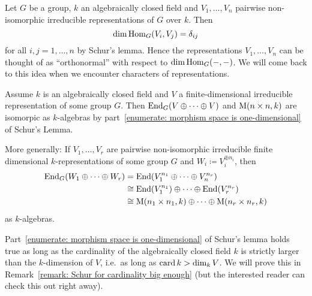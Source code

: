 \begin{remark}
  Let $G$ be a group, $k$ an algebraically closed field and $V_1, \dotsc, V_n$ pairwise non-isomorphic irreducible representations of $G$ over $k$.
  Then
  \[
      \dim \operatorname{Hom}_G(V_i, V_j)
    = \delta_{ij}
  \]
  for all $i,j = 1, \dotsc, n$ by Schur’s lemma.
  Hence the representations $V_1, \dotsc, V_n$ can be thought of as “orthonormal” with respect to $\dim \operatorname{Hom}_G(-,-)$.
  We will come back to this idea when we encounter characters of representations.
\end{remark}


\begin{remark}
  Assume $k$ is an algebraically closed field and $V$ a finite-dimensional irreducible representation of some group $G$.
  Then $\operatorname{End}_G(V \oplus \dotsb \oplus V)$ and $\operatorname{M}(n \times n, k)$ are isomorpic as $k$-algebras by part~\ref{enumerate: morphism space is one-dimensional} of Schur’s Lemma.
  
  More generally:
  If $V_1, \dotsc, V_r$ are pairwise non-isomorphic irreducible finite dimensional $k$-representations of some group $G$ and $W_i \coloneqq V_i^{\oplus n_i}$, then
  \begin{align*}
            \operatorname{End}_G(W_1 \oplus \dotsb \oplus W_r)
    &=      \operatorname{End}(V_1^{n_1} \oplus \dotsb \oplus V_n^{n_r})
    \\
    &\cong  \operatorname{End}(V_1^{n_1}) \oplus \dotsb \oplus \operatorname{End}(V_r^{n_r})
    \\
    &\cong  \operatorname{M}(n_1 \times n_1, k) \oplus \dotsb \oplus \operatorname{M}(n_r \times n_r, k)
  \end{align*}
  as $k$-algebras.
\end{remark}


\begin{remark}
  Part~\ref{enumerate: morphism space is one-dimensional} of Schur’s lemma holds true as long as the cardinality of the algebraically closed field $k$ is strictly larger than the $k$-dimension of $V$, i.e.\ as long as $\operatorname{card} k > \dim_k V$.
  We will prove this in Remark~\ref{remark: Schur for cardinality big enough} (but the interested reader can check this out right away).
\end{remark}


